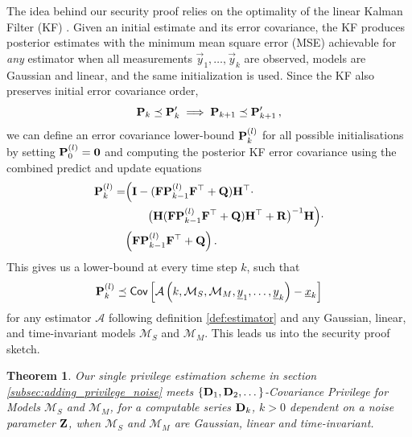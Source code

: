 \documentclass[letterpaper, 10 pt, conference]{ieeeconf}
\newtheorem{theorem}{Theorem}[section]
\begin{document}
The idea behind our security proof relies on the optimality of the linear Kalman Filter (KF) \cite{haugBayesianEstimationTracking2012}. Given an initial estimate and its error covariance, the KF produces posterior estimates with the minimum mean square error (MSE) achievable for \textit{any} estimator when all measurements $\vec{y}_1,\dots,\vec{y}_k$ are observed, models are Gaussian and linear, and the same initialization is used. Since the KF also preserves initial error covariance order,
\begin{equation}
   {\ensuremath{{\mathbf{P}}}}_k \preceq {\ensuremath{{\mathbf{P}}}}_k^\prime \implies {\ensuremath{{\mathbf{P}}}}_{k+1} \preceq {\ensuremath{{\mathbf{P}}}}_{k+1}^\prime\,,
\end{equation}
we can define an error covariance lower-bound ${{\mathbf{P}}}_k^{(l)}$ for all possible initialisations by setting ${{\mathbf{P}}}_0^{(l)} = {{\mathbf{0}}}$ and computing the posterior KF error covariance using the combined predict and update equations
\begin{equation}\label{eqn:lower_bound_error_cov}
   \begin{split}
      {\ensuremath{{\mathbf{P}}}}_k^{(l)} =& \Bigl( {{\mathbf{I}}} - ({{\mathbf{F}}}{{\mathbf{P}}}_{k-1}^{(l)}{{\mathbf{F}}}^\top + {{\mathbf{Q}}}){{\mathbf{H}}}^\top \cdot \\
      &\qquad\bigl({{\mathbf{H}}}({{\mathbf{F}}}{{\mathbf{P}}}_{k-1}^{(l)}{{\mathbf{F}}}^\top + {{\mathbf{Q}}}){{\mathbf{H}}}^\top + {{\mathbf{R}}}\bigr)^{-1}{{\mathbf{H}}}\Bigr)\cdot\\
      &\Bigl({{\mathbf{F}}}{{\mathbf{P}}}_{k-1}^{(l)}{{\mathbf{F}}}^\top + {{\mathbf{Q}}}\Bigr)\,.
   \end{split}
\end{equation}
This gives us a lower-bound at every time step $k$, such that
\begin{equation}
   {\ensuremath{{\mathbf{P}}}}_k^{(l)} \preceq \mathsf{Cov}\left[\mathcal{A}\left(k, \mathcal{M}_S, \mathcal{M}_M, {\underline{y}}_1,\dots,{\underline{y}}_k\right) - {\underline{x}}_k \right]
\end{equation}
for any estimator $\mathcal{A}$ following definition \ref{def:estimator} and any Gaussian, linear, and time-invariant models $\mathcal{M}_S$ and $\mathcal{M}_M$. This leads us into the security proof sketch.

\begin{theorem}\label{thm:prooved_thm}
   Our single privilege estimation scheme in section \ref{subsec:adding_privilege_noise} meets $\{{{\mathbf{D}}}_1,{{\mathbf{D}}}_2,\dots\}$-Covariance Privilege for Models $\mathcal{M}_S$ and $\mathcal{M}_M$, for a computable series ${{\mathbf{D}}}_k$, $k>0$ dependent on a noise parameter ${{\mathbf{Z}}}$, when $\mathcal{M}_S$ and $\mathcal{M}_M$ are Gaussian, linear and time-invariant.
\end{theorem}
\end{document}
